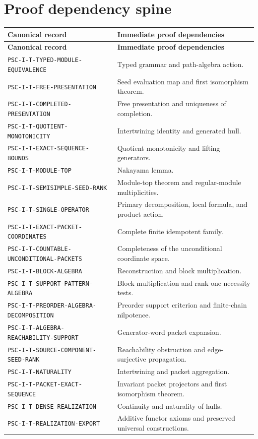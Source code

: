 \documentclass[11pt]{article}
\theoremstyle{definition}
\theoremstyle{remark}
\begin{document}
\section{Proof dependency spine}

\small
\begin{longtable}{@{}p{}p{}@{}}
\toprule
\textbf{Canonical record} & \textbf{Immediate proof dependencies}\\
\midrule
\endfirsthead
\toprule
\textbf{Canonical record} & \textbf{Immediate proof dependencies}\\
\midrule
\endhead
\texttt{PSC-I-T-TYPED-MODULE-EQUIVALENCE} & Typed grammar and path-algebra action.\\
\texttt{PSC-I-T-FREE-PRESENTATION} & Seed evaluation map and first isomorphism theorem.\\
\texttt{PSC-I-T-COMPLETED-PRESENTATION} & Free presentation and uniqueness of completion.\\
\texttt{PSC-I-T-QUOTIENT-MONOTONICITY} & Intertwining identity and generated hull.\\
\texttt{PSC-I-T-EXACT-SEQUENCE-BOUNDS} & Quotient monotonicity and lifting generators.\\
\texttt{PSC-I-T-MODULE-TOP} & Nakayama lemma.\\
\texttt{PSC-I-T-SEMISIMPLE-SEED-RANK} & Module-top theorem and regular-module multiplicities.\\
\texttt{PSC-I-T-SINGLE-OPERATOR} & Primary decomposition, local formula, and product action.\\
\texttt{PSC-I-T-EXACT-PACKET-COORDINATES} & Complete finite idempotent family.\\
\texttt{PSC-I-T-COUNTABLE-}\newline\texttt{UNCONDITIONAL-PACKETS} & Completeness of the unconditional coordinate space.\\
\texttt{PSC-I-T-BLOCK-ALGEBRA} & Reconstruction and block multiplication.\\
\texttt{PSC-I-T-SUPPORT-PATTERN-ALGEBRA} & Block multiplication and rank-one necessity tests.\\
\texttt{PSC-I-T-PREORDER-}\newline\texttt{ALGEBRA-DECOMPOSITION} & Preorder support criterion and finite-chain nilpotence.\\
\texttt{PSC-I-T-ALGEBRA-}\newline\texttt{REACHABILITY-SUPPORT} & Generator-word packet expansion.\\
\texttt{PSC-I-T-SOURCE-COMPONENT-SEED-RANK} & Reachability obstruction and edge-surjective propagation.\\
\texttt{PSC-I-T-NATURALITY} & Intertwining and packet aggregation.\\
\texttt{PSC-I-T-PACKET-EXACT-SEQUENCE} & Invariant packet projectors and first isomorphism theorem.\\
\texttt{PSC-I-T-DENSE-REALIZATION} & Continuity and naturality of hulls.\\
\texttt{PSC-I-T-REALIZATION-EXPORT} & Additive functor axioms and preserved universal constructions.\\
\bottomrule
\end{longtable}
\normalsize
\end{document}
